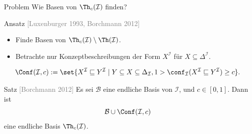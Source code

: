 \documentclass[ngerman]{beamer}
\newcommand{\pseudocite}[1]{\textcolor{gray}{[#1]}}
\begin{document}
\begin{frame}

  \onslide<+->

  \begin{block}{Problem}
    Wie Basen von $\Th_{c}(\mathcal{I})$ finden?
  \end{block}

  \onslide<+->

  \begin{block}{Ansatz \pseudocite{Luxenburger 1993, Borchmann 2012}}
    \begin{itemize}
    \item<+-> Finde Basen von $\Th_{c}(\mathcal{I}) \setminus \Th(\mathcal{I})$.
    \item<+-> Betrachte nur Konzeptbeschreibungen der Form $X^{\mathcal{I}}$ für $X
      \subseteq \Delta^{\mathcal{I}}$.
    \end{itemize}
  \end{block}

  

  \onslide<+->

  \begin{Definition}
    \vspace*{-2ex}
    \begin{equation*}
      \Conf(\mathcal{I}, c) := \set{ X^{\mathcal{I}} \sqsubseteq Y^{\mathcal{I}} \mid Y
        \subseteq X \subseteq \Delta_{\mathcal{I}}, 1 > \conf_{\mathcal{I}}(
        X^{\mathcal{I}} \sqsubseteq Y^{\mathcal{I}}) \ge c}.
    \end{equation*}
  \end{Definition}

  \onslide<+->

  \begin{block}{Satz \pseudocite{Borchmann 2012}}
    Es sei $\mathcal{B}$ eine endliche Basis von $\mathcal{I}$, und $c \in [0, 1]$.  Dann
    ist 
    \begin{equation*}
      \mathcal{B} \cup \Conf(\mathcal{I},c)
    \end{equation*}
    eine endliche Basis $\Th_c(\mathcal{I})$.
  \end{block}
  
\end{frame}
\end{document}
